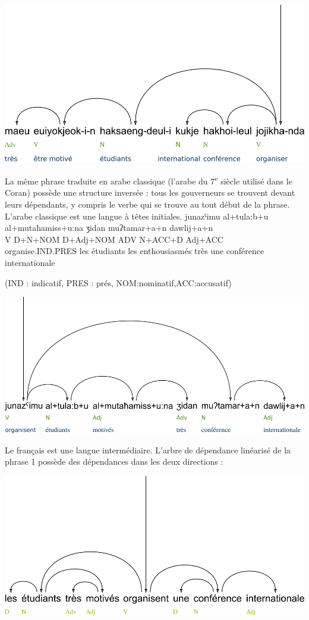 {    \includegraphics[width=\textwidth]{figures/vol1syntaxe2-img029.png}

    La même phrase traduite en arabe classique (l’arabe du 7\textsuperscript{e} siècle utilisé dans le Coran) possède une structure inversée : tous les gouverneurs se trouvent devant leurs dépendants, y compris le verbe qui se trouve au tout début de la phrase. L’arabe classique est une langue à têtes initiales.
    \ea
    {junazˤimu}  {al+tula:b+u}  {al+mutaħamiss+u:na}  {ʒidan}  {muʔtamar+a+n}  {dawlij+a+n} \\
    V  D+N+NOM  D+Adj+NOM  ADV  N+ACC+D  Adj+ACC\\
    organise.IND.PRES  les étudiants  les enthousiasmés  très  une conférence  internationale

    (IND : indicatif, PRES : prés, NOM:nominatif,ACC:accusatif)
    \z

    \includegraphics[width=\textwidth]{figures/vol1syntaxe2-img030.png}

    Le français est une langue intermédiaire. L’arbre de dépendance linéarisé de la phrase 1 possède des dépendances dans les deux directions :

    \includegraphics[width=\textwidth]{figures/vol1syntaxe2-img031.png}

}
